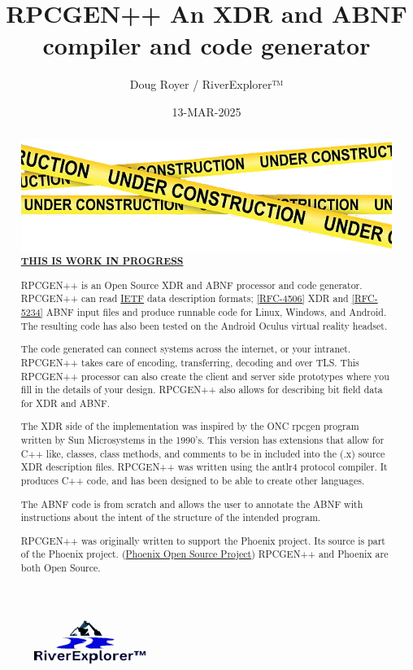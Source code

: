 \documentclass[2pt]{article}
\author{Doug Royer / RiverExplorer™}
\date{13-MAR-2025}
\title{RPCGEN++ An XDR and ABNF compiler and code generator}
\begin{document}
\maketitle
\begin{figure}
  \centering
  \includegraphics{RiverExplorerLLC-Logo-BLACK-131x50-Transparent.ps.png}
\end{figure}
  
\begin{abstract}

  \includegraphics{UnderConstruction.png}
  \underline{\textbf{THIS IS WORK IN PROGRESS}}
  
  RPCGEN++ is an Open Source XDR and ABNF processor and code generator.
  RPCGEN++ can read \href{https://ietf.org}{IETF} data description
  formats;
  \href{https://datatracker.ietf.org/doc/html/rfc4506}{[RFC-4506]}
  XDR and \href{https://datatracker.ietf.org/doc/html/rfc5234}{[RFC-5234]}
  ABNF input files and produce runnable code for Linux, Windows,
  and Android. The resulting code has also been tested on the Android
  Oculus virtual reality headset.

  The code generated can connect systems across the internet,
  or your intranet.
  RPCGEN++ takes care of encoding, transferring, decoding and over
  TLS. This RPCGEN++ processor can also create the client and server side
  prototypes where you fill in the details of your design.
  RPCGEN++ also allows for describing bit field data for XDR and ABNF.
  
  The XDR side of the implementation was inspired by the ONC
  rpcgen program written by Sun Microsystems
  in the 1990's.
  This version has extensions that allow for C++ like, classes, class
  methods, and comments to be in included into the (.x) source XDR
  description files. RPCGEN++ was written using the antlr4 protocol
  compiler. It produces C++ code, and has been designed to be able
  to create other languages.

  The ABNF code is from scratch and allows the user to annotate
  the ABNF with instructions about the intent of the structure
  of the intended program.
  
  RPCGEN++ was originally written to support the Phoenix project.
  Its source is part of the Phoenix project.
  (\href{https://github.com/RiverExplorer/Phoenix}{Phoenix Open Source Project})
  RPCGEN++ and Phoenix are both Open Source.
\end{abstract}
\end{document}

